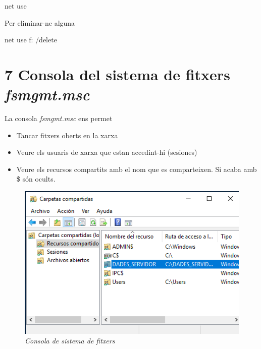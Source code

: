 \documentclass[
  a4paper,
]{article}
\newenvironment{Shaded}{\begin{snugshade}}{\end{snugshade}}
\newcommand{\AttributeTok}[1]{\textcolor[rgb]{0.13,0.29,0.53}{#1}}
\newcommand{\NormalTok}[1]{#1}
\providecommand{\tightlist}{%
  \setlength{\itemsep}{0pt}\setlength{\parskip}{0pt}}
\begin{document}
\begin{Shaded}
\begin{Highlighting}[]
\NormalTok{net use}
\end{Highlighting}
\end{Shaded}

Per eliminar-ne alguna

\begin{Shaded}
\begin{Highlighting}[]
\NormalTok{net use f: }\AttributeTok{/delete}
\end{Highlighting}
\end{Shaded}

\section{\texorpdfstring{7 Consola del sistema de fitxers
\emph{fsmgmt.msc}}{7 Consola del sistema de fitxers fsmgmt.msc}}\label{consola-del-sistema-de-fitxers-fsmgmt.msc}

La consola \emph{fsmgmt.msc} ens permet

\begin{itemize}
\tightlist
\item
  Tancar fitxers oberts en la xarxa
\item
  Veure els usuaris de xarxa que estan accedint-hi (sesiones)
\item
  Veure els recursos compartits amb el nom que es comparteixen. Si acaba
  amb \$ són ocults.
\end{itemize}

\begin{figure}
\centering
\includegraphics{png/ADDS/fsmgmt.png}
\caption{\emph{Consola de sistema de fitxers}}
\end{figure}
\end{document}
